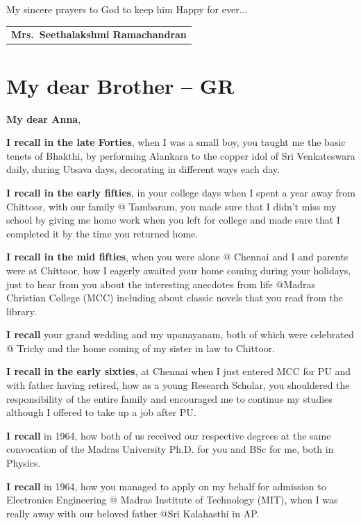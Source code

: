 My sincere prayers to God to keep him Happy for ever...
\bigskip

\begin{flushright}
\begin{tabular}{c}
\textbf{Mrs.\ Seethalakshmi Ramachandran}
\end{tabular}
\end{flushright}
\bigskip

\section*{My dear Brother – GR}

\noindent 
\textbf{My dear Anna},

\textbf{I recall in the late Forties}, when I was a small boy, you taught me the basic tenets of Bhakthi, by performing Alankara to the copper idol of Sri Venkateswara daily, during Utsava days, decorating in different ways each day.

\textbf{I recall in the early fifties}, in your college days when I spent a year away from Chittoor, with our family @ Tambaram, you made sure that I didn’t miss my school by giving me home work when you left for college and made sure that I completed it by the time you returned home.

\textbf{I recall in the mid fifties}, when you were alone @ Chennai and I and parents were at Chittoor, how I eagerly awaited your home coming during your holidays, just to hear from you about the interesting anecdotes from life @Madras Christian  College (MCC) including about classic novels that you read from the library.

\textbf{I recall} your grand wedding and my upanayanam, both of which were celebrated @ Trichy and the home coming of my sister in law to Chittoor.

\textbf{I recall in the early sixties}, at Chennai when I just entered MCC for PU and with father having retired, how as a young Research Scholar, you shouldered the responsibility of the entire family and encouraged me to continue my studies although I offered to take up a job after PU.

\textbf{I recall} in 1964, how both of us received our respective degrees at the same convocation of the Madras University Ph.D. for you and BSc for me, both in Physics.

\textbf{I recall} in 1964, how you managed to apply on my behalf for admission to Electronics Engineering @ Madras Institute of Technology (MIT), when I was really away with our beloved father @Sri Kalahasthi in AP.

